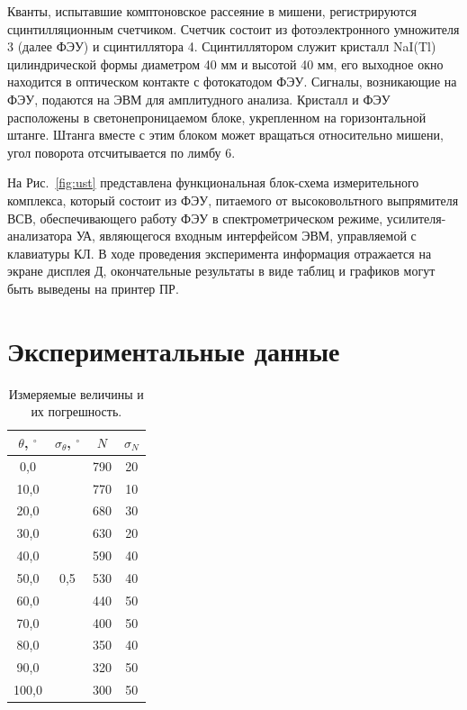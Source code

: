 \documentclass[a4paper, 12pt]{article}
\begin{document}
	Кванты, испытавшие комптоновское рассеяние в мишени, регистрируются сцинтилляционным счетчиком. Счетчик состоит из фотоэлектронного умножителя 3 (далее ФЭУ) и сцинтиллятора 4. Сцинтиллятором служит кристалл NaI(Tl) цилиндрической формы диаметром 40 мм и высотой 40 мм, его выходное окно находится в оптическом контакте с фотокатодом ФЭУ. Сигналы, возникающие на ФЭУ, подаются на ЭВМ для амплитудного анализа. Кристалл и ФЭУ расположены в светонепроницаемом блоке, укрепленном на горизонтальной штанге. Штанга вместе с этим блоком может вращаться относительно мишени, угол поворота отсчитывается по лимбу 6.
	
	На Рис.~\ref{fig:ust} представлена функциональная блок-схема измерительного комплекса, который состоит из ФЭУ, питаемого от высоковольтного выпрямителя ВСВ, обеспечивающего работу ФЭУ в спектрометрическом режиме, усилителя-анализатора УА, являющегося входным интерфейсом ЭВМ, управляемой с клавиатуры КЛ. В ходе проведения эксперимента информация отражается на экране дисплея Д, окончательные результаты в виде таблиц и графиков могут быть выведены на принтер ПР.
	
	\section*{Экспериментальные данные}
	
		\begin{table}[h]
			\caption{Измеряемые величины и их погрешность.}
			\centering
			\label{table:parametr}
			\begin{tabular}{|c|c|c|c|}
				\hline
				$\theta$, $^\circ$ & $\sigma_\theta$, $^\circ$ & $N$ & $\sigma_N$ \\ \hline
				0,0                & \multirow{11}{*}{0,5}     & 790 & 20         \\ \cline{1-1} \cline{3-4} 
				10,0               &                           & 770 & 10         \\ \cline{1-1} \cline{3-4} 
				20,0               &                           & 680 & 30         \\ \cline{1-1} \cline{3-4} 
				30,0               &                           & 630 & 20         \\ \cline{1-1} \cline{3-4} 
				40,0               &                           & 590 & 40         \\ \cline{1-1} \cline{3-4} 
				50,0               &                           & 530 & 40         \\ \cline{1-1} \cline{3-4} 
				60,0               &                           & 440 & 50         \\ \cline{1-1} \cline{3-4} 
				70,0               &                           & 400 & 50         \\ \cline{1-1} \cline{3-4} 
				80,0               &                           & 350 & 40         \\ \cline{1-1} \cline{3-4} 
				90,0               &                           & 320 & 50         \\ \cline{1-1} \cline{3-4} 
				100,0              &                           & 300 & 50         \\ \hline
			\end{tabular}
		\end{table}
	
\end{document}
